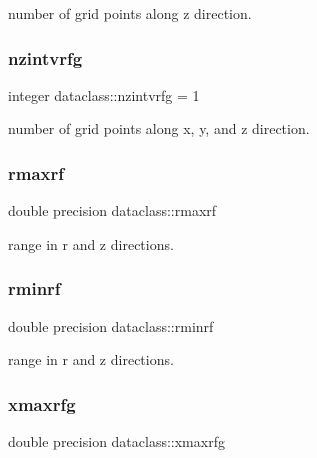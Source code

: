 number of grid points along z direction. 

\mbox{\label{namespacedataclass_a53f757bd562f34f7e8e6bb58606fc289}} 
\subsubsection{\texorpdfstring{nzintvrfg}{nzintvrfg}}
{\footnotesize\ttfamily integer dataclass\+::nzintvrfg = 1}



number of grid points along x, y, and z direction. 

\mbox{\label{namespacedataclass_a8ea08da279b20aa500095cba377a2de2}} 
\subsubsection{\texorpdfstring{rmaxrf}{rmaxrf}}
{\footnotesize\ttfamily double precision dataclass\+::rmaxrf}



range in r and z directions. 

\mbox{\label{namespacedataclass_aae1944e971e5c71db5d8f21afceb0935}} 
\subsubsection{\texorpdfstring{rminrf}{rminrf}}
{\footnotesize\ttfamily double precision dataclass\+::rminrf}



range in r and z directions. 

\mbox{\label{namespacedataclass_a32b5b26da65d1b3507a36c17029a18ae}} 
\subsubsection{\texorpdfstring{xmaxrfg}{xmaxrfg}}
{\footnotesize\ttfamily double precision dataclass\+::xmaxrfg}



